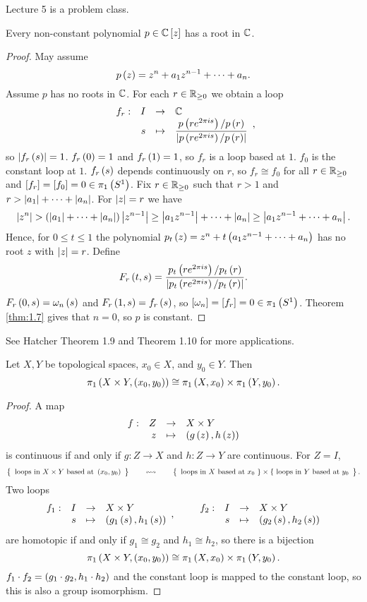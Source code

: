 
Lecture 5 is a problem class.


\begin{theorem}
Every non-constant polynomial $ p \in \mathbb{C}\left[ z \right] $ has a root in $ \mathbb{C} $.
\end{theorem}

\begin{proof}
May assume
$$ p\left( z \right) = z^n + a_1z^{n - 1} + \dots + a_n. $$
Assume $ p $ has no roots in $ \mathbb{C} $. For each $ r \in \mathbb{R}_{\ge 0} $ we obtain a loop
$$ \function[f_r]{I}{\C}{s}{\dfrac{p\rb{re^{2\pi is}} / p\rb{r}}{\abs{p\rb{re^{2\pi is}} / p\rb{r}}}}, $$
so $ \left\lvert f_r\left( s \right) \right\rvert = 1 $. $ f_r\left( 0 \right) = 1 $ and $ f_r\left( 1 \right) = 1 $, so $ f_r $ is a loop based at $ 1 $. $ f_0 $ is the constant loop at $ 1 $. $ f_r\left( s \right) $ depends continuously on $ r $, so $ f_r \cong f_0 $ for all $ r \in \mathbb{R}_{\ge 0} $ and $ \left[ f_r \right] = \left[ f_0 \right] = 0 \in \pi_1\left( S^1 \right) $. Fix $ r \in \mathbb{R}_{\ge 0} $ such that $ r > 1 $ and $ r > \left\lvert a_1 \right\rvert + \dots + \left\lvert a_n \right\rvert $. For $ \left\lvert z \right\rvert = r $ we have
$$ \left\lvert z^n \right\rvert > \left( \left\lvert a_1 \right\rvert + \dots + \left\lvert a_n \right\rvert \right)\left\lvert z^{n - 1} \right\rvert \ge \left\lvert a_1z^{n - 1} \right\rvert + \dots + \left\lvert a_n \right\rvert \ge \left\lvert a_1z^{n - 1} + \dots + a_n \right\rvert. $$
Hence, for $ 0 \le t \le 1 $ the polynomial $ p_t\left( z \right) = z^n + t\left( a_1z^{n - 1} + \dots + a_n \right) $ has no root $ z $ with $ \left\lvert z \right\rvert = r $. Define
$$ F_r\left( t, s \right) = \dfrac{p_t\left( re^{2\pi is} \right) / p_t\left( r \right)}{\left\lvert p_t\left( re^{2\pi is} \right) / p_t\left( r \right) \right\rvert}. $$
$ F_r\left( 0, s \right) = \omega_n\left( s \right) $ and $ F_r\left( 1, s \right) = f_r\left( s \right) $, so $ \left[ \omega_n \right] = \left[ f_r \right] = 0 \in \pi_1\left( S^1 \right) $. Theorem \ref{thm:1.7} gives that $ n = 0 $, so $ p $ is constant.
\end{proof}

See Hatcher Theorem 1.9 and Theorem 1.10 for more applications.

\begin{proposition}
Let $ X, Y $ be topological spaces, $ x_0 \in X $, and $ y_0 \in Y $. Then
$$ \pi_1\left( X \times Y, \left( x_0, y_0 \right) \right) \cong \pi_1\left( X, x_0 \right) \times \pi_1\left( Y, y_0 \right). $$
\end{proposition}

\begin{proof}
A map
$$ \function[f]{Z}{X \times Y}{z}{\rb{g\rb{z}, h\rb{z}}} $$
is continuous if and only if $ g : Z \to X $ and $ h : Z \to Y $ are continuous. For $ Z = I $,
$$ \correspondence{\text{loops in} \ X \times Y \ \text{based at} \ \rb{x_0, y_0}}{\text{loops in} \ X \ \text{based at} \ x_0 \ \} \times \{ \ \text{loops in} \ Y \ \text{based at} \ y_0}. $$
Two loops
$$ \function[f_1]{I}{X \times Y}{s}{\rb{g_1\rb{s}, h_1\rb{s}}}, \qquad \function[f_2]{I}{X \times Y}{s}{\rb{g_2\rb{s}, h_2\rb{s}}} $$
are homotopic if and only if $ g_1 \cong g_2 $ and $ h_1 \cong h_2 $, so there is a bijection
$$ \pi_1\left( X \times Y, \left( x_0, y_0 \right) \right) \cong \pi_1\left( X, x_0 \right) \times \pi_1\left( Y, y_0 \right). $$
$ f_1 \cdot f_2 = \left( g_1 \cdot g_2, h_1 \cdot h_2 \right) $ and the constant loop is mapped to the constant loop, so this is also a group isomorphism.
\end{proof}

